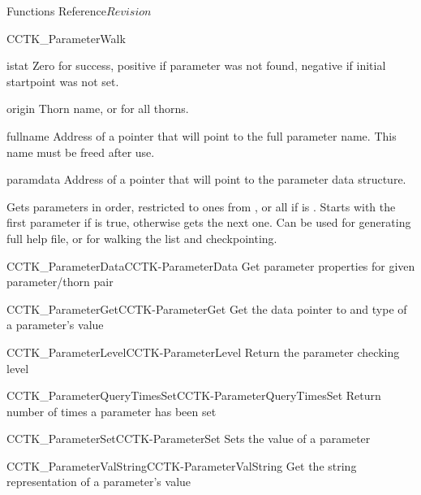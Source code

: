 \begin{cactuspart}{ Functions Reference}{}{$Revision$}
\begin{FunctionDescription}{CCTK\_ParameterWalk}
\begin{ResultSection}
\begin{Result}{istat}
Zero for success, positive if parameter was not found, negative if
initial startpoint was not set.
\end{Result}
\end{ResultSection}

\begin{ParameterSection}
\begin{Parameter}{origin}
Thorn name, or  for all thorns.
\end{Parameter}
\begin{Parameter}{fullname}
Address of a pointer that will point to the full parameter name.  This
name must be freed after use.
\end{Parameter}
\begin{Parameter}{paramdata}
Address of a pointer that will point to the parameter data structure.
\end{Parameter}
\end{ParameterSection}

\begin{Discussion}
Gets parameters in order, restricted to ones from , or
all if  is .  Starts with the first parameter
if  is true, otherwise gets the next one.  Can be used for
generating full help file, or for walking the list and checkpointing.
\end{Discussion}

\begin{SeeAlsoSection}
\begin{SeeAlso2}{CCTK\_ParameterData}{CCTK-ParameterData}
  Get parameter properties for given parameter/thorn pair
\end{SeeAlso2}
\begin{SeeAlso2}{CCTK\_ParameterGet}{CCTK-ParameterGet}
  Get the data pointer to and type of a parameter's value
\end{SeeAlso2}
\begin{SeeAlso2}{CCTK\_ParameterLevel}{CCTK-ParameterLevel}
  Return the parameter checking level
\end{SeeAlso2}
\begin{SeeAlso2}{CCTK\_ParameterQueryTimesSet}{CCTK-ParameterQueryTimesSet}
  Return number of times a parameter has been set
\end{SeeAlso2}
\begin{SeeAlso2}{CCTK\_ParameterSet}{CCTK-ParameterSet}
  Sets the value of a parameter
\end{SeeAlso2}
\begin{SeeAlso2}{CCTK\_ParameterValString}{CCTK-ParameterValString}
  Get the string representation of a parameter's value
\end{SeeAlso2}
\end{SeeAlsoSection}


\end{FunctionDescription}
\end{cactuspart}
